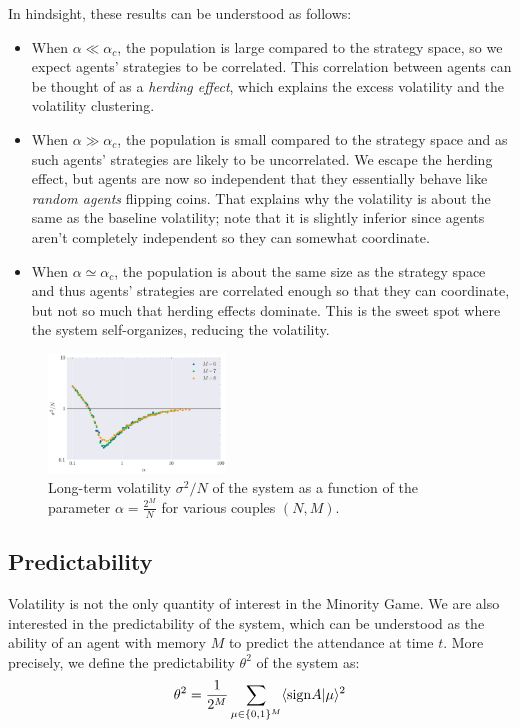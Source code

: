 \documentclass[a4paper, amsfonts, amssymb, amsmath, reprint, showkeys, nofootinbib, twoside]{revtex4-1}
\begin{document}
In hindsight, these results can be understood as follows:
\begin{itemize}
    \item When $\alpha \ll \alpha_c$, the population is large compared to the strategy space, so we expect agents' strategies to be correlated. This correlation between agents can be thought of as a \textit{herding effect}, which explains the excess volatility and the volatility clustering.
    \item When $\alpha \gg \alpha_c$, the population is small compared to the strategy space and as such agents' strategies are likely to be uncorrelated. We escape the herding effect, but agents are now so independent that they essentially behave like \textit{random agents} flipping coins. That explains why the volatility is about the same as the baseline volatility; note that it is slightly inferior since agents aren't completely independent so they can somewhat coordinate.
    \item When $\alpha \simeq \alpha_c$, the population is about the same size as the strategy space and thus agents' strategies are correlated enough so that they can coordinate, but not so much that herding effects dominate. This is the sweet spot where the system self-organizes, reducing the volatility.
\end{itemize}

\begin{figure}[H]
    \centering
    \includegraphics[width=0.42\textwidth]{figures/volatility.png}
    \caption{Long-term volatility $\sigma^2 / N$ of the system as a function of the parameter $\alpha = \frac{2^M}{N}$ for various couples $(N, M)$.}
    \label{fig:volatility}
\end{figure}

\subsection{Predictability}

Volatility is not the only quantity of interest in the Minority Game. We are also interested in the predictability of the system, which can be understood as the ability of an agent with memory $M$ to predict the attendance at time $t$. More precisely, we define the predictability $\theta^2$ of the system as:
\begin{equation}
    \theta^2 = \frac{1}{2^M} \sum_{\mu \in \{0, 1\}^M} \langle \textnormal{sign}A|\mu \rangle^2
\end{equation}
\end{document}
